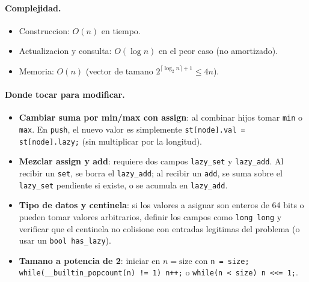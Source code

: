 \paragraph{Complejidad.}
\begin{itemize}\setlength\itemsep{0pt}
	\item Construccion: $O(n)$ en tiempo.
	\item Actualizacion y consulta: $O(\log n)$ en el peor caso (no amortizado).
	\item Memoria: $O(n)$ (vector de tamano $2^{\lceil \log_2 n \rceil + 1} \le 4n$).
\end{itemize}

\paragraph{Donde tocar para modificar.}
\begin{itemize}\setlength\itemsep{0pt}
	\item \textbf{Cambiar suma por min/max con assign}: al combinar hijos tomar \texttt{min} o \texttt{max}. En \texttt{push}, el nuevo valor es simplemente \texttt{st[node].val = st[node].lazy;} (sin multiplicar por la longitud).
	\item \textbf{Mezclar assign y add}: requiere dos campos \texttt{lazy\_set} y \texttt{lazy\_add}. Al recibir un \texttt{set}, se borra el \texttt{lazy\_add}; al recibir un \texttt{add}, se suma sobre el \texttt{lazy\_set} pendiente si existe, o se acumula en \texttt{lazy\_add}.
	\item \textbf{Tipo de datos y centinela}: si los valores a asignar son enteros de 64 bits o pueden tomar valores arbitrarios, definir los campos como \texttt{long long} y verificar que el centinela no colisione con entradas legitimas del problema (o usar un \texttt{bool has\_lazy}).
	\item \textbf{Tamano a potencia de 2}: iniciar en $n = \text{size}$ con \verb|n = size; while(__builtin_popcount(n) != 1) n++;| o \verb|while(n < size) n <<= 1;|.
\end{itemize}

